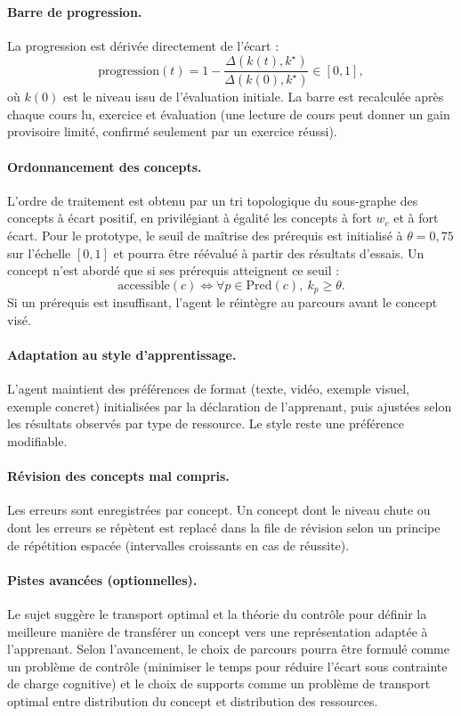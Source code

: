 \documentclass[11pt,a4paper]{article}
\begin{document}
\paragraph{Barre de progression.}
La progression est dérivée directement de l'écart :
\[
\text{progression}(t) = 1 - \frac{\Delta(k(t),k^\star)}{\Delta(k(0),k^\star)} \in [0,1],
\]
où $k(0)$ est le niveau issu de l'évaluation initiale. La barre est recalculée après chaque cours lu, exercice et évaluation (une lecture de cours peut donner un gain provisoire limité, confirmé seulement par un exercice réussi).

\paragraph{Ordonnancement des concepts.}
L'ordre de traitement est obtenu par un tri topologique du sous-graphe des concepts à écart positif, en privilégiant à égalité les concepts à fort $w_c$ et à fort écart. Pour le prototype, le seuil de maîtrise des prérequis est initialisé à $\theta=0{,}75$ sur l'échelle $[0,1]$ et pourra être réévalué à partir des résultats d'essais. Un concept n'est abordé que si ses prérequis atteignent ce seuil :
\[
\text{accessible}(c) \iff \forall p\in\mathrm{Pred}(c),\ k_p\ge\theta .
\]
Si un prérequis est insuffisant, l'agent le réintègre au parcours avant le concept visé.

\paragraph{Adaptation au style d'apprentissage.}
L'agent maintient des préférences de format (texte, vidéo, exemple visuel, exemple concret) initialisées par la déclaration de l'apprenant, puis ajustées selon les résultats observés par type de ressource. Le style reste une préférence modifiable.

\paragraph{Révision des concepts mal compris.}
Les erreurs sont enregistrées par concept. Un concept dont le niveau chute ou dont les erreurs se répètent est replacé dans la file de révision selon un principe de répétition espacée (intervalles croissants en cas de réussite).

\paragraph{Pistes avancées (optionnelles).}
Le sujet suggère le transport optimal et la théorie du contrôle pour définir la meilleure manière de transférer un concept vers une représentation adaptée à l'apprenant. Selon l'avancement, le choix de parcours pourra être formulé comme un problème de contrôle (minimiser le temps pour réduire l'écart sous contrainte de charge cognitive) et le choix de supports comme un problème de transport optimal entre distribution du concept et distribution des ressources.
\end{document}
